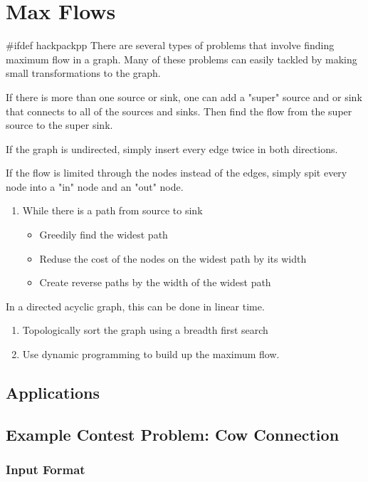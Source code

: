 \section{Max Flows}
#ifdef hackpackpp
There are several types of problems that involve finding maximum flow in a graph.
Many of these problems can easily tackled by making small transformations to the graph.


If there is more than one source or sink,  one can add a "super" source and or sink that connects to all of the sources and sinks.
Then find the flow from the super source to the super sink.


If the graph is undirected, simply insert every edge twice in both directions.


If the flow is limited through the nodes instead of the edges, simply spit every node into a "in" node and an "out" node.


\begin{enumerate}
	\item While there is a path from source to sink
	\begin{itemize}
		\item Greedily find the widest path
		\item Reduse the cost of the nodes on the widest path by its width
		\item Create reverse paths by the width of the widest path
	\end{itemize}
\end{enumerate}

In a directed acyclic graph, this can be done in linear time.

\begin{enumerate}
	\item Topologically sort the graph using a breadth first search
	\item Use dynamic programming to build up the maximum flow.
\end{enumerate}

\subsection{Applications}
\subsection{Example Contest Problem: Cow Connection}
\subsubsection{Input Format}
